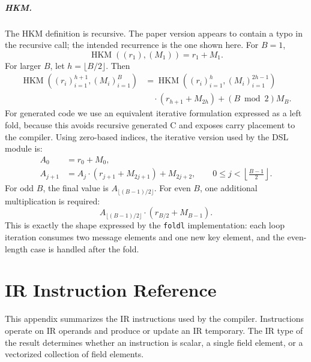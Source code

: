 \paragraph{HKM.}
The HKM definition is recursive. The paper version appears to contain a typo in the recursive call; the intended recurrence is the one shown here. For \(B=1\),
\[
    \operatorname{HKM}((r_1),(M_1)) = r_1 + M_1.
\]
For larger \(B\), let \(h=\lfloor B/2\rfloor\). Then
\[
\begin{aligned}
    \operatorname{HKM}((r_i)_{i=1}^{h+1},(M_i)_{i=1}^{B})
    &=
    \operatorname{HKM}((r_i)_{i=1}^{h},(M_i)_{i=1}^{2h-1})  \\
    &\quad{}\cdot (r_{h+1}+M_{2h}) + (B \bmod 2)M_B.
\end{aligned}
\]
For generated code we use an equivalent iterative formulation expressed as a left fold, because this avoids recursive generated C and exposes carry placement to the compiler.
Using zero-based indices, the iterative version used by the DSL module is:
\[
\begin{aligned}
    A_0 &= r_0 + M_0, \\
    A_{j+1}
        &= A_j \cdot (r_{j+1}+M_{2j+1}) + M_{2j+2},
        \qquad 0 \leq j < \left\lfloor\frac{B-1}{2}\right\rfloor .
\end{aligned}
\]
For odd \(B\), the final value is \(A_{\lfloor(B-1)/2\rfloor}\). For even \(B\), one additional multiplication is required:
\[
    A_{\lfloor(B-1)/2\rfloor}\cdot (r_{B/2}+M_{B-1}).
\]
This is exactly the shape expressed by the \texttt{foldl} implementation: each loop iteration consumes two message elements and one new key element, and the even-length case is handled after the fold.

\chapter{IR Instruction Reference}
\label{app:ir-instructions}

This appendix summarizes the IR instructions used by the compiler. Instructions operate on IR operands and produce or update an IR temporary. The IR type of the result determines whether an instruction is scalar, a single field element, or a vectorized collection of field elements.

